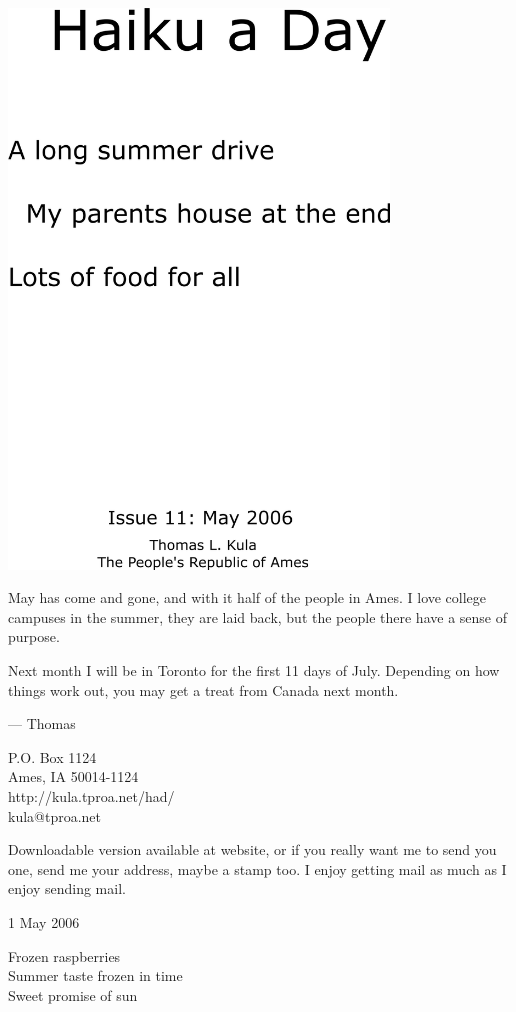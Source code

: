 \documentclass[12pt]{article}
\begin{document}
\includegraphics[width=101mm]{frontpage.png}

\newpage

May has come and gone, and with it half of the people
in Ames. I love college campuses in the summer, they
are laid back, but the people there have a sense of
purpose.

Next month I will be in Toronto for the first 11 days
of July. Depending on how things work out, you may get
a treat from Canada next month.

--- Thomas

P.O. Box 1124 \\
Ames, IA 50014-1124 \\
http://kula.tproa.net/had/ \\
kula@tproa.net

Downloadable version available at website, or if you really
want me to send you one, send me your address, maybe a
stamp too. I enjoy getting mail as much as I enjoy sending
mail.\\

\setlength{\parskip}{1mm}

1 May 2006

Frozen raspberries \\
Summer taste frozen in time \\
Sweet promise of sun
\end{document}
